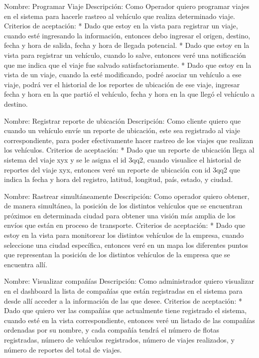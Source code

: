 \documentclass{article}
\begin{document}
Nombre: Programar Viaje
Descripción: Como Operador quiero programar viajes en el sistema para hacerle rastreo al vehículo que realiza determinado viaje.
Criterios de aceptación:
* Dado que estoy en la vista para registrar un viaje, cuando esté ingresando la información, entonces debo ingresar el origen, destino, fecha y hora de salida, fecha y hora de llegada potencial.
* Dado que estoy en la vista para registrar un vehículo, cuando lo salve, entonces veré una notificación que me indica que el viaje fue salvado satisfactoriamente.
* Dado que estoy en la vista de un viaje, cuando la esté modificando, podré asociar un vehículo a ese viaje, podrá ver el historial de los reportes de ubicación de ese viaje, ingresar fecha y hora en la que partió el vehículo, fecha y hora en la que llegó el vehículo a destino.

Nombre: Registrar reporte de ubicación
Descripción: Como cliente quiero que cuando un vehículo envíe un reporte de ubicación, este sea registrado al viaje correspondiente, para poder efectivamente hacer rastreo de los viajes que realizan los vehículos.
Criterios de aceptación:
* Dado que un reporte de ubicación llega al sistema del viaje xyx y se le asigna el id 3qq2, cuando visualice el historial de reportes del viaje xyx, entonces veré un reporte de ubicación con id 3qq2 que indica la fecha y hora del registro, latitud, longitud, país, estado, y ciudad.

Nombre: Rastrear simultáneamente
Descripción: Como operador quiero obtener, de manera simultánea, la posición de los distintos vehículos que se encuentran próximos en determinada ciudad para obtener una visión más amplia de los envíos que están en proceso de transporte.
Criterios de aceptación:
* Dado que estoy en la vista para monitorear los distintos vehículos de la empresa, cuando seleccione una ciudad específica, entonces veré en un mapa los diferentes puntos que representan la posición de los distintos vehículos de la empresa que se encuentra allí.

Nombre: Visualizar compañías
Descripción: Como administrador quiero visualizar en el dashboard la lista de compañías que están registradas en el sistema para desde allí acceder a la información de las que desee.
Criterios de aceptación:
* Dado que quiero ver las compañías que actualmente tiene registrado el sistema, cuando esté en la vista correspondiente, entonces veré un listado de las compañías ordenadas por su nombre, y cada compañía tendrá el número de flotas registradas, número de vehículos registrados, número de viajes realizados, y número de reportes del total de viajes.
\end{document}
